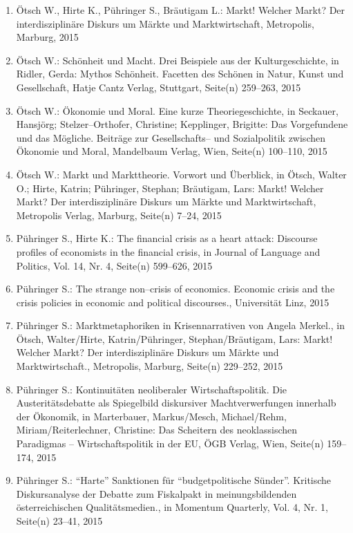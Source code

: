 \begin{enumerate}
    	 \item Ötsch W., Hirte K., Pühringer S., Bräutigam L.: Markt! Welcher Markt? Der interdisziplinäre Diskurs um Märkte und Marktwirtschaft, Metropolis, Marburg, 2015
	 \item Ötsch W.: Schönheit und Macht. Drei Beispiele aus der Kulturgeschichte, in Ridler, Gerda: Mythos Schönheit. Facetten des Schönen in Natur, Kunst und Gesellschaft, Hatje Cantz Verlag, Stuttgart, Seite(n) 259--263, 2015
	 \item Ötsch W.: Ökonomie und Moral. Eine kurze Theoriegeschichte, in Seckauer, Hansjörg; Stelzer--Orthofer, Christine; Kepplinger, Brigitte: Das Vorgefundene und das Mögliche. Beiträge zur Gesellschafts-- und Sozialpolitik zwischen Ökonomie und Moral, Mandelbaum Verlag, Wien, Seite(n) 100--110, 2015
	 \item Ötsch W.: Markt und Markttheorie. Vorwort und Überblick, in Ötsch, Walter O.; Hirte, Katrin; Pühringer, Stephan; Bräutigam, Lars: Markt! Welcher Markt? Der interdisziplinäre Diskurs um Märkte und Marktwirtschaft, Metropolis Verlag, Marburg, Seite(n) 7--24, 2015
	 \item Pühringer S., Hirte K.: The financial crisis as a heart attack: Discourse profiles of economists in the financial crisis, in Journal of Language and Politics, Vol. 14, Nr. 4, Seite(n) 599--626, 2015
	 \item Pühringer S.: The strange non--crisis of economics. Economic crisis and the crisis policies in economic and political discourses., Universität Linz, 2015
	 \item Pühringer S.: Marktmetaphoriken in Krisennarrativen von Angela Merkel., in Ötsch, Walter/Hirte, Katrin/Pühringer, Stephan/Bräutigam, Lars: Markt! Welcher Markt? Der interdisziplinäre Diskurs um Märkte und Marktwirtschaft., Metropolis, Marburg, Seite(n) 229--252, 2015
	 \item Pühringer S.: Kontinuitäten neoliberaler Wirtschaftspolitik. Die Austeritätsdebatte als Spiegelbild diskursiver Machtverwerfungen innerhalb der Ökonomik, in Marterbauer, Markus/Mesch, Michael/Rehm, Miriam/Reiterlechner, Christine: Das Scheitern des neoklassischen Paradigmas – Wirtschaftspolitik in der EU, ÖGB Verlag, Wien, Seite(n) 159--174, 2015
	 \item Pühringer S.: “Harte” Sanktionen für “budgetpolitische Sünder”. Kritische Diskursanalyse der Debatte zum Fiskalpakt in meinungsbildenden österreichischen Qualitätsmedien., in Momentum Quarterly, Vol. 4, Nr. 1, Seite(n) 23--41, 2015

\end{enumerate}
